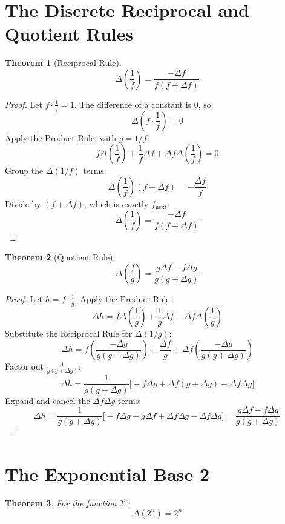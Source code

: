 \documentclass[12pt]{article}
\newtheorem{theorem}{Theorem}
\newcommand{\next}[1]{#1_{\text{next}}}
\begin{document}
\section{The Discrete Reciprocal and Quotient Rules}

\begin{theorem}[Reciprocal Rule]
\[ \Delta\left(\frac{1}{f}\right) = \frac{-\Delta f}{f(f + \Delta f)} \]
\end{theorem}

\begin{proof}
Let $f \cdot \frac{1}{f} = 1$. The difference of a constant is 0, so:
\[ \Delta\left(f \cdot \frac{1}{f}\right) = 0 \]
Apply the Product Rule, with $g = 1/f$:
\[ f \Delta\left(\frac{1}{f}\right) + \frac{1}{f}\Delta f + \Delta f \Delta\left(\frac{1}{f}\right) = 0 \]
Group the $\Delta(1/f)$ terms:
\[ \Delta\left(\frac{1}{f}\right) (f + \Delta f) = -\frac{\Delta f}{f} \]
Divide by $(f + \Delta f)$, which is exactly $\next{f}$:
\[ \Delta\left(\frac{1}{f}\right) = \frac{-\Delta f}{f(f + \Delta f)} \]
\end{proof}

\begin{theorem}[Quotient Rule]
\[ \Delta\left(\frac{f}{g}\right) = \frac{g\Delta f - f\Delta g}{g(g + \Delta g)} \]
\end{theorem}

\begin{proof}
Let $h = f \cdot \frac{1}{g}$. Apply the Product Rule:
\[ \Delta h = f\Delta\left(\frac{1}{g}\right) + \frac{1}{g}\Delta f + \Delta f \Delta\left(\frac{1}{g}\right) \]
Substitute the Reciprocal Rule for $\Delta(1/g)$:
\[ \Delta h = f\left(\frac{-\Delta g}{g(g + \Delta g)}\right) + \frac{\Delta f}{g} + \Delta f\left(\frac{-\Delta g}{g(g + \Delta g)}\right) \]
Factor out $\frac{1}{g(g + \Delta g)}$:
\[ \Delta h = \frac{1}{g(g + \Delta g)} \Big[ -f\Delta g + \Delta f(g + \Delta g) - \Delta f \Delta g \Big] \]
Expand and cancel the $\Delta f \Delta g$ terms:
\[ \Delta h = \frac{1}{g(g + \Delta g)} \Big[ -f\Delta g + g\Delta f + \Delta f \Delta g - \Delta f \Delta g \Big] = \frac{g\Delta f - f\Delta g}{g(g + \Delta g)} \]
\end{proof}

\section{The Exponential Base 2}

\begin{theorem}
For the function $2^n$:
\[ \Delta(2^n) = 2^n \]
\end{theorem}
\end{document}
